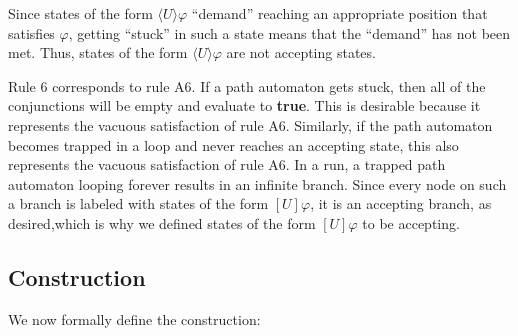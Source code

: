 \documentclass[10pt,a4paper]{amsart}
\theoremstyle{plain}
\theoremstyle{definition}
\theoremstyle{definition}
\newcommand{\dbox}[1]{\langle #1 \rangle}
\newcommand{\bbox}[1]{[ #1 ]}
\DeclareMathOperator{\?}{?}
\begin{document}
Since states of the form $\dbox{U}\varphi$ ``demand'' reaching an appropriate position that satisfies $\varphi$, getting ``stuck'' in such a state means that the ``demand'' has not been met. Thus, states of the form $\dbox{U}\varphi$ are not accepting states.

Rule 6 corresponds to rule A6. If a path automaton gets stuck, then all of the conjunctions will be empty and evaluate to \textbf{true}. This is desirable because it represents the vacuous satisfaction of rule A6. Similarly, if the path automaton becomes trapped in a loop and never reaches an accepting state, this also represents the vacuous satisfaction of rule A6. In a run, a trapped path automaton looping forever results in an infinite branch. Since every node on such a branch is labeled with states of the form $\bbox{U}\varphi$, it is an accepting branch, as desired,which is why we defined states of the form $\bbox{U}\varphi$ to be accepting.

\subsection{Construction}

We now formally define the construction:
\end{document}
